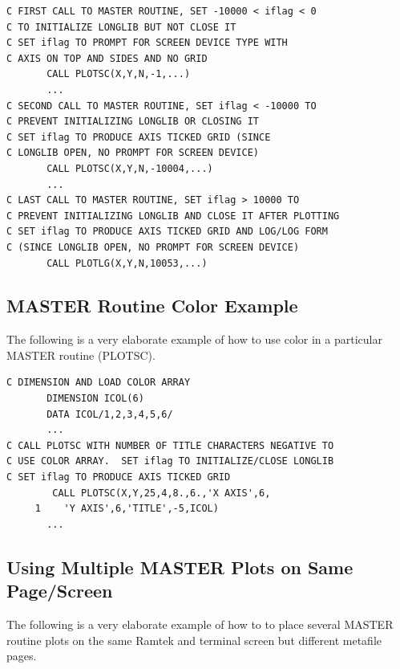 \documentclass[11pt]{report}
\begin{document}
\begin{verbatim}
C FIRST CALL TO MASTER ROUTINE, SET -10000 < iflag < 0
C TO INITIALIZE LONGLIB BUT NOT CLOSE IT
C SET iflag TO PROMPT FOR SCREEN DEVICE TYPE WITH
C AXIS ON TOP AND SIDES AND NO GRID
       CALL PLOTSC(X,Y,N,-1,...) 
       ...
C SECOND CALL TO MASTER ROUTINE, SET iflag < -10000 TO
C PREVENT INITIALIZING LONGLIB OR CLOSING IT
C SET iflag TO PRODUCE AXIS TICKED GRID (SINCE
C LONGLIB OPEN, NO PROMPT FOR SCREEN DEVICE)
       CALL PLOTSC(X,Y,N,-10004,...)
       ...
C LAST CALL TO MASTER ROUTINE, SET iflag > 10000 TO
C PREVENT INITIALIZING LONGLIB AND CLOSE IT AFTER PLOTTING
C SET iflag TO PRODUCE AXIS TICKED GRID AND LOG/LOG FORM
C (SINCE LONGLIB OPEN, NO PROMPT FOR SCREEN DEVICE)
       CALL PLOTLG(X,Y,N,10053,...)
\end{verbatim}

\subsection{MASTER Routine Color Example}

The following is a very elaborate example of how to use color in a particular
MASTER routine (PLOTSC).


\begin{verbatim}
C DIMENSION AND LOAD COLOR ARRAY
       DIMENSION ICOL(6)
       DATA ICOL/1,2,3,4,5,6/
       ...
C CALL PLOTSC WITH NUMBER OF TITLE CHARACTERS NEGATIVE TO
C USE COLOR ARRAY.  SET iflag TO INITIALIZE/CLOSE LONGLIB
C SET iflag TO PRODUCE AXIS TICKED GRID
        CALL PLOTSC(X,Y,25,4,8.,6.,'X AXIS',6,
     1    'Y AXIS',6,'TITLE',-5,ICOL)
       ...
\end{verbatim}

\newpage
\subsection{Using Multiple MASTER Plots on Same Page/Screen}

The following is a very elaborate example of how to to place several
MASTER routine plots on the same Ramtek and terminal screen but different
metafile pages.
\end{document}
